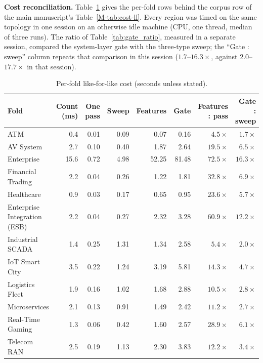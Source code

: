 \noindent\textbf{Cost reconciliation.} Table~\ref{tab:r8-cost} gives the per-fold rows behind the corpus row of the main manuscript's Table~\ref{M-tab:cost-ll}. Every region was timed on the same topology in one session on an otherwise idle machine (CPU, one thread, median of three runs). The ratio of Table~\ref{tab:gate_ratio}, measured in a separate session, compared the system-layer gate with the three-type sweep; the ``Gate : sweep'' column repeats that comparison in this session ($1.7$--$16.3\times$, against $2.0$--$17.7\times$ in that session).

\begin{table}[htbp]
\centering
\scriptsize
\caption{Per-fold like-for-like cost (seconds unless stated).}
\label{tab:r8-cost}
\begin{tabular}{lrrrrrrr}
\toprule
Fold & Count (ms) & One pass & Sweep & Features & Gate & Features : pass & Gate : sweep \\
\midrule
ATM & 0.4 & 0.01 & 0.09 & 0.07 & 0.16 & $4.5\times$ & $1.7\times$ \\
AV System & 2.7 & 0.10 & 0.40 & 1.87 & 2.64 & $19.5\times$ & $6.5\times$ \\
Enterprise & 15.6 & 0.72 & 4.98 & 52.25 & 81.48 & $72.5\times$ & $16.3\times$ \\
Financial Trading & 2.2 & 0.04 & 0.26 & 1.22 & 1.81 & $32.8\times$ & $6.9\times$ \\
Healthcare & 0.9 & 0.03 & 0.17 & 0.65 & 0.95 & $23.6\times$ & $5.7\times$ \\
Enterprise Integration (ESB) & 2.2 & 0.04 & 0.27 & 2.32 & 3.28 & $60.9\times$ & $12.2\times$ \\
Industrial SCADA & 1.4 & 0.25 & 1.31 & 1.34 & 2.58 & $5.4\times$ & $2.0\times$ \\
IoT Smart City & 3.5 & 0.22 & 1.24 & 3.19 & 5.81 & $14.3\times$ & $4.7\times$ \\
Logistics Fleet & 1.9 & 0.16 & 1.02 & 1.68 & 2.88 & $10.5\times$ & $2.8\times$ \\
Microservices & 2.1 & 0.13 & 0.91 & 1.49 & 2.42 & $11.2\times$ & $2.7\times$ \\
Real-Time Gaming & 1.3 & 0.06 & 0.42 & 1.60 & 2.57 & $28.9\times$ & $6.1\times$ \\
Telecom RAN & 2.5 & 0.19 & 1.13 & 2.30 & 3.83 & $12.2\times$ & $3.4\times$ \\
\bottomrule
\end{tabular}
\end{table}
